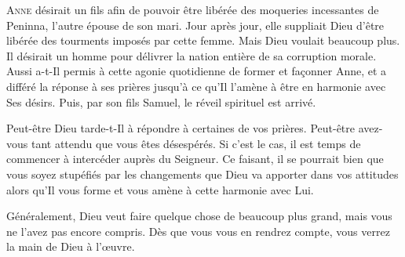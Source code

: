 



\lettrine{A}{nne} désirait un fils afin de pouvoir être libérée
 des moqueries incessantes de Peninna, l'autre épouse de son mari.
 Jour après jour, elle suppliait Dieu d'être libérée des tourments
 imposés par cette femme.
 Mais Dieu voulait beaucoup plus. Il désirait un homme pour délivrer
 la nation entière de sa corruption morale.
 Aussi a-t-Il permis à cette agonie quotidienne de former et fa\c{c}onner Anne,
 et a différé la réponse à ses prières jusqu'à ce qu'Il l'amène
 à être en harmonie avec Ses désirs.
 Puis, par son fils Samuel, le réveil spirituel est arrivé.

Peut-être Dieu tarde-t-Il à répondre à certaines de vos prières.
 Peut-être avez-vous tant attendu que vous êtes désespérés.
 Si c'est le cas, il est temps de commencer à intercéder auprès du Seigneur.
 Ce faisant, il se pourrait bien que vous soyez stupéfiés par les changements
 que Dieu va apporter dans vos attitudes alors qu'Il vous forme
 et vous amène à cette harmonie avec Lui.


Généralement, Dieu veut faire quelque chose de beaucoup plus grand,
 mais vous ne l'avez pas encore compris.
 Dès que vous vous en rendrez compte, vous verrez la main de Dieu à l'\oe{}uvre. 

\dvrule





